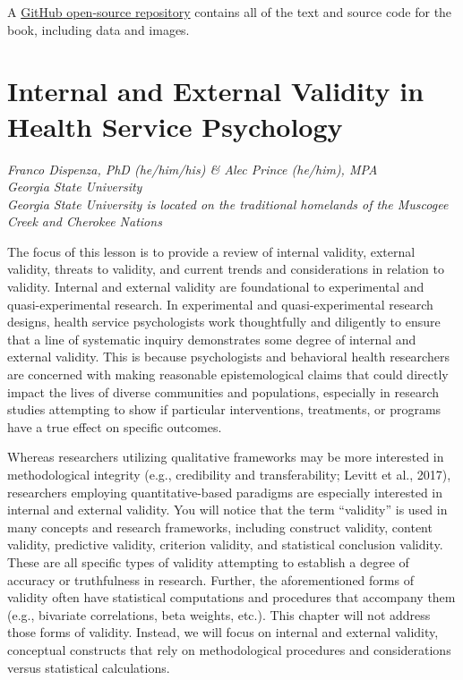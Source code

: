 \documentclass[
  11pt,
]{book}
\begin{document}
A \href{https://github.com/lhbikos/ReC_MultivModel}{GitHub open-source repository} contains all of the text and source code for the book, including data and images.

\hypertarget{InExVal}{%
\chapter{Internal and External Validity in Health Service Psychology}\label{InExVal}}

\emph{Franco Dispenza, PhD (he/him/his) \& Alec Prince (he/him), MPA}\\
\emph{Georgia State University}\\
\emph{Georgia State University is located on the traditional homelands of the Muscogee Creek and Cherokee Nations}

The focus of this lesson is to provide a review of internal validity, external validity, threats to validity, and current trends and considerations in relation to validity. Internal and external validity are foundational to experimental and quasi-experimental research. In experimental and quasi-experimental research designs, health service psychologists work thoughtfully and diligently to ensure that a line of systematic inquiry demonstrates some degree of internal and external validity. This is because psychologists and behavioral health researchers are concerned with making reasonable epistemological claims that could directly impact the lives of diverse communities and populations, especially in research studies attempting to show if particular interventions, treatments, or programs have a true effect on specific outcomes.

Whereas researchers utilizing qualitative frameworks may be more interested in methodological integrity (e.g., credibility and transferability; Levitt et al., 2017), researchers employing quantitative-based paradigms are especially interested in internal and external validity. You will notice that the term ``validity'' is used in many concepts and research frameworks, including construct validity, content validity, predictive validity, criterion validity, and statistical conclusion validity. These are all specific types of validity attempting to establish a degree of accuracy or truthfulness in research. Further, the aforementioned forms of validity often have statistical computations and procedures that accompany them (e.g., bivariate correlations, beta weights, etc.). This chapter will not address those forms of validity. Instead, we will focus on internal and external validity, conceptual constructs that rely on methodological procedures and considerations versus statistical calculations.
\end{document}
